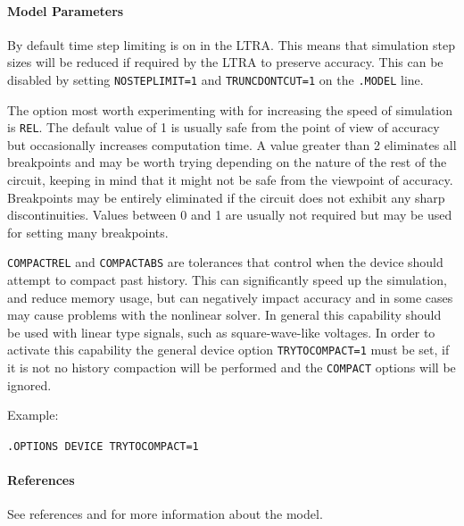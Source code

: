 \paragraph{Model Parameters}


By default time step limiting is on in the LTRA. This means that
simulation step sizes will be reduced if required by the LTRA to
preserve accuracy. This can be disabled by setting
\texttt{NOSTEPLIMIT=1} and \texttt{TRUNCDONTCUT=1} on the
\texttt{.MODEL} line.

The option most worth experimenting with for increasing the speed of
simulation is \texttt{REL}. The default value of 1 is usually safe
from the point of view of accuracy but occasionally increases
computation time. A value greater than 2 eliminates all breakpoints
and may be worth trying depending on the nature of the rest of the
circuit, keeping in mind that it might not be safe from the viewpoint
of accuracy. Breakpoints may be entirely eliminated if the circuit
does not exhibit any sharp discontinuities. Values between 0 and 1 are
usually not required but may be used for setting many breakpoints.

\texttt{COMPACTREL} and \texttt{COMPACTABS} are tolerances that
control when the device should attempt to compact past history. This
can significantly speed up the simulation, and reduce memory usage,
but can negatively impact accuracy and in some cases may cause
problems with the nonlinear solver. In general this capability should
be used with linear type signals, such as square-wave-like
voltages. In order to activate this capability the general device
option \texttt{TRYTOCOMPACT=1} must be set, if it is not no history
compaction will be performed and the \texttt{COMPACT} options will be
ignored.

Example:

\texttt{.OPTIONS DEVICE TRYTOCOMPACT=1}

\paragraph{References}
See references \cite{Roychodhury:1994} and \cite{Spice3f5-user-guide} for more information
about the model.

